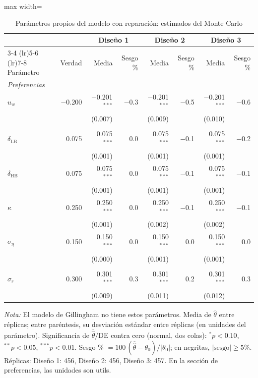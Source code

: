 \begin{table}[htbp]
\centering
\small
\setlength{\tabcolsep}{4.5pt}
\begin{adjustbox}{max width=\textwidth}
\begin{tabular}{l r rr rr rr}
\toprule
 & & \multicolumn{2}{c}{Diseño 1} & \multicolumn{2}{c}{Diseño 2} & \multicolumn{2}{c}{Diseño 3}\\
\cmidrule(lr){3-4} \cmidrule(lr){5-6} \cmidrule(lr){7-8}
Parámetro & Verdad & Media & Sesgo \% & Media & Sesgo \% & Media & Sesgo \%\\
\midrule
\multicolumn{8}{l}{\textit{Preferencias}}\\
$u_w$ & $-$0.200 & $-$0.201$^{***}$ & $-$0.3 & $-$0.201$^{***}$ & $-$0.5 & $-$0.201$^{***}$ & $-$0.6\\
 &  & (0.007) &  & (0.009) &  & (0.010) & \\[1pt]
\addlinespace
\multicolumn{8}{l}{\textit{Desgaste}}\\
$\delta_{\text{LB}}$ & 0.075 & 0.075$^{***}$ & 0.0 & 0.075$^{***}$ & $-$0.1 & 0.075$^{***}$ & $-$0.2\\
 &  & (0.001) &  & (0.001) &  & (0.001) & \\[1pt]
$\delta_{\text{HB}}$ & 0.075 & 0.075$^{***}$ & 0.0 & 0.075$^{***}$ & $-$0.1 & 0.075$^{***}$ & $-$0.1\\
 &  & (0.001) &  & (0.001) &  & (0.001) & \\[1pt]
$\kappa$ & 0.250 & 0.250$^{***}$ & 0.0 & 0.250$^{***}$ & $-$0.1 & 0.250$^{***}$ & $-$0.1\\
 &  & (0.001) &  & (0.002) &  & (0.002) & \\[1pt]
$\sigma_\eta$ & 0.150 & 0.150$^{***}$ & 0.0 & 0.150$^{***}$ & 0.0 & 0.150$^{***}$ & 0.0\\
 &  & (0.000) &  & (0.001) &  & (0.001) & \\[1pt]
\addlinespace
\multicolumn{8}{l}{\textit{Reparación}}\\
$\sigma_r$ & 0.300 & 0.301$^{***}$ & 0.3 & 0.301$^{***}$ & 0.2 & 0.301$^{***}$ & 0.3\\
 &  & (0.009) &  & (0.011) &  & (0.012) & \\[1pt]
\bottomrule
\end{tabular}
\end{adjustbox}
\caption{Parámetros propios del modelo con reparación: estimados del Monte Carlo}
\label{tab:mc-propios}
\par\smallskip
\begin{minipage}{\textwidth}\footnotesize
\textit{Nota:} El modelo de Gillingham no tiene estos parámetros. Media de $\hat\theta$ entre réplicas;
entre paréntesis, su desviación estándar entre réplicas (en unidades del parámetro).
Significancia de $\overline{\hat\theta}/\text{DE}$ contra cero (normal, dos colas):
$^{*}p<0.10$, $^{**}p<0.05$, $^{***}p<0.01$.
Sesgo \% $=100\,(\overline{\hat\theta}-\theta_0)/|\theta_0|$; en negritas, $|\text{sesgo}|\ge5\%$.
Réplicas: Diseño 1: 456, Diseño 2: 456, Diseño 3: 457. En la sección de preferencias, las unidades son utils.
\end{minipage}
\end{table}
